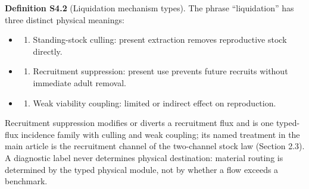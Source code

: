 \documentclass[
  10pt,
  a4paper,
]{article}
\providecommand{\tightlist}{%
  \setlength{\itemsep}{0pt}\setlength{\parskip}{0pt}}
\begin{document}
\textbf{Definition S4.2} (Liquidation mechanism types). The phrase
``liquidation'' has three distinct physical meanings:

\begin{itemize}
\tightlist
\item
  \begin{enumerate}
  \def\labelenumi{(\roman{enumi})}
  \tightlist
  \item
    Standing-stock culling: present extraction removes reproductive
    stock directly.
  \end{enumerate}
\item
  \begin{enumerate}
  \def\labelenumi{(\roman{enumi})}
  \setcounter{enumi}{1}
  \tightlist
  \item
    Recruitment suppression: present use prevents future recruits
    without immediate adult removal.
  \end{enumerate}
\item
  \begin{enumerate}
  \def\labelenumi{(\roman{enumi})}
  \setcounter{enumi}{2}
  \tightlist
  \item
    Weak viability coupling: limited or indirect effect on reproduction.
  \end{enumerate}
\end{itemize}

Recruitment suppression modifies or diverts a recruitment flux and is
one typed-flux incidence family with culling and weak coupling; its
named treatment in the main article is the recruitment channel of the
two-channel stock law (Section 2.3). A diagnostic label never determines
physical destination: material routing is determined by the typed
physical module, not by whether a flow exceeds a benchmark.
\end{document}
